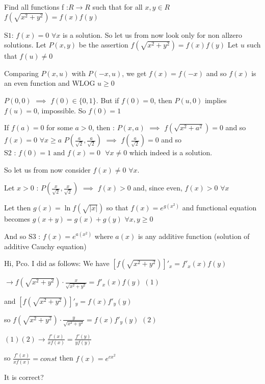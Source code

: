 \begin{solution}
	\begin{tcolorbox}Find all functions f :$ R \to R$ such that for all $x,y \in R $
$f \left( \sqrt{x^2+y^2} \right) = f(x)f(y)$\end{tcolorbox}
$\boxed{\text{S1: }f(x)=0}$ $\forall x$ is a solution. So let us from now look only for non allzero solutions.
Let $P(x,y)$ be the assertion $f(\sqrt{x^2+y^2})=f(x)f(y)$
Let $u$ such that $f(u)\ne 0$

Comparing $P(x,u)$ with $P(-x,u)$, we get $f(x)=f(-x)$ and so $f(x)$ is an even function and WLOG $u\ge 0$

$P(0,0)$ $\implies$ $f(0)\in\{0,1\}$. But if $f(0)=0$, then $P(u,0)$ implies $f(u)=0$, impossible. So $f(0)=1$

If $f(a)=0$ for some $a>0$, then :
$P(x,a)$ $\implies$ $f(\sqrt{x^2+a^2})=0$ and so $f(x)=0$ $\forall x\ge a$
$P(\frac a{\sqrt 2},\frac a{\sqrt 2})$ $\implies$ $f(\frac a{\sqrt 2})=0$ and so $\boxed{\text{S2 : }f(0)=1\text{ and }f(x)=0\text{   }\forall x\ne 0}$ which indeed is a solution.

So let us from now consider $f(x)\ne 0$ $\forall x$.

Let $x>0$ : $P(\frac x{\sqrt 2},\frac x{\sqrt 2})$ $\implies$ $f(x)>0$ and, since even, $f(x)>0$ $\forall x$

Let then $g(x)=\ln f(\sqrt{|x|})$ so that $f(x)=e^{g(x^2)}$ and functional equation becomes $g(x+y)=g(x)+g(y)$ $\forall x,y\ge 0$

And so $\boxed{\text{S3 : }f(x)=e^{a(x^2)}}$ where $a(x)$ is any additive function (solution of additive Cauchy equation)
\end{solution}



\begin{solution}
	Hi, Pco. I did as follows:
We have $\left[ f\left(\sqrt{x^2+y^2}\right) \right]'_x = f'_x(x)f(y) $

$\rightarrow f\left(\sqrt{x^2+y^2}\right) \cdot \frac{x}{\sqrt{x^2+y^2}} = f'_x(x)f(y) $                 $(1)$

and $\left[ f\left(\sqrt{x^2+y^2}\right) \right]'_y = f(x)f'_y(y) $

so $f\left(\sqrt{x^2+y^2}\right) \cdot \frac{y}{\sqrt{x^2+y^2}} = f(x)f'_y(y) $                              $(2)$

$(1)(2) \rightarrow \frac{f'(x)}{xf(x)}=\frac{f'(y)}{yf(y)}$

so $\frac{f'(x)}{xf(x)}=const$
then $f(x)=e^{cx^2}$

It is correct?
\end{solution}



